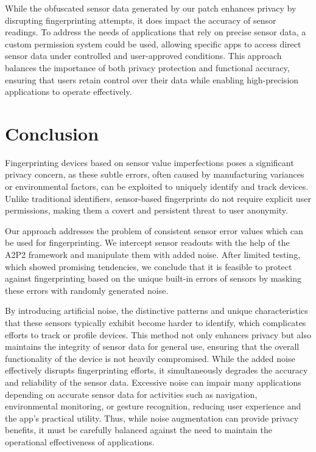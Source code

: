 \documentclass[11pt,
  oneside,openany,    %
]{scrreprt}
\begin{document}
While the obfuscated sensor data generated by our patch enhances privacy by disrupting fingerprinting attempts, it does impact the accuracy of sensor readings. 
To address the needs of applications that rely on precise sensor data, a custom permission system could be used, allowing specific apps to access direct sensor data under controlled and user-approved conditions. 
This approach balances the importance of both privacy protection and functional accuracy, ensuring that users retain control over their data while enabling high-precision applications to operate effectively.


\chapter{Conclusion}
\label{chap:conclusion}
Fingerprinting devices based on sensor value imperfections poses a significant privacy concern, as these subtle errors, often caused by manufacturing variances or environmental factors, can be exploited to uniquely identify and track devices.
Unlike traditional identifiers, sensor-based fingerprints do not require explicit user permissions, making them a covert and persistent threat to user anonymity. 

Our approach addresses the problem of consistent sensor error values which can be used for fingerprinting.
We intercept sensor readouts with the help of the A2P2 framework and manipulate them with added noise.
After limited testing, which showed promising tendencies, we conclude that it is feasible to protect against fingerprinting based on the unique built-in errors of sensors by masking these errors with randomly generated noise.

By introducing artificial noise, the distinctive patterns and unique characteristics that these sensors typically exhibit become harder to identify, which complicates efforts to track or profile devices.
This method not only enhances privacy but also maintains the integrity of sensor data for general use, ensuring that the overall functionality of the device is not heavily compromised.
While the added noise effectively disrupts fingerprinting efforts, it simultaneously degrades the accuracy and reliability of the sensor data.
Excessive noise can impair many applications depending on accurate sensor data for activities such as navigation, environmental monitoring, or gesture recognition, reducing user experience and the app's practical utility.
Thus, while noise augmentation can provide privacy benefits, it must be carefully balanced against the need to maintain the operational effectiveness of applications.
\end{document}
